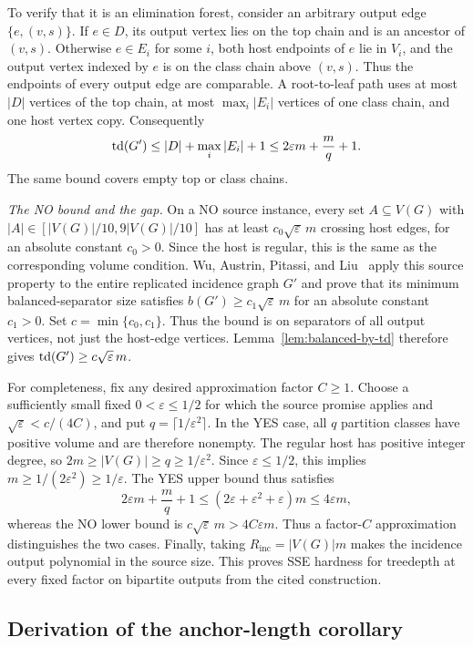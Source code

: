 To verify that it is an elimination forest, consider an arbitrary
output edge $\{e,(v,s)\}$. If $e\in D$, its output vertex lies on
the top chain and is an ancestor of $(v,s)$. Otherwise $e\in E_i$
for some $i$, both host endpoints of $e$ lie in $V_i$, and the
output vertex indexed by $e$ is on the class chain above $(v,s)$.
Thus the endpoints of every output edge are comparable. A
root-to-leaf path uses at most $|D|$ vertices of the top chain,
at most $\max_i|E_i|$ vertices of one class chain, and one host
vertex copy. Consequently
\[
 \operatorname{td}(G')\leq |D|+\max_i|E_i|+1
 \leq 2\varepsilon m+\frac{m}{q}+1.
\]
The same bound covers empty top or class chains.

\emph{The NO bound and the gap.}
On a NO source instance, every set $A\subseteq V(G)$ with
$|A|\in[|V(G)|/10,9|V(G)|/10]$ has at least
$c_0\sqrt{\varepsilon}\,m$ crossing host edges, for an absolute
constant $c_0>0$. Since the host is regular, this is the same as the
corresponding volume condition. Wu, Austrin, Pitassi, and Liu~\cite[Lemma~5.1]{APW}
apply this source property to the entire replicated incidence graph
$G'$ and prove that its minimum balanced-separator size satisfies
$b(G')\geq c_1\sqrt{\varepsilon}\,m$ for an absolute constant
$c_1>0$. Set $c=\min\{c_0,c_1\}$. Thus the bound is on separators
of all output vertices, not just the host-edge vertices.
Lemma~\ref{lem:balanced-by-td} therefore gives
$\operatorname{td}(G')\geq c\sqrt{\varepsilon}\,m$.

For completeness, fix any desired approximation factor $C\geq1$.
Choose a sufficiently small fixed $0<\varepsilon\leq1/2$ for which
the source promise applies and $\sqrt{\varepsilon}<c/(4C)$, and
put $q=\lceil1/\varepsilon^2\rceil$. In the YES case, all $q$
partition classes have positive volume and are therefore nonempty.
The regular host has positive integer degree, so
$2m\geq|V(G)|\geq q\geq1/\varepsilon^2$.
Since $\varepsilon\leq1/2$, this implies
$m\geq1/(2\varepsilon^2)\geq1/\varepsilon$. The YES upper bound thus satisfies
\[
 2\varepsilon m+\frac{m}{q}+1
 \leq(2\varepsilon+\varepsilon^2+\varepsilon)m
 \leq4\varepsilon m,
\]
whereas the NO lower bound is
$c\sqrt{\varepsilon}\,m>4C\varepsilon m$. Thus a factor-$C$
approximation distinguishes the two cases. Finally, taking
$R_{\mathrm{inc}}=|V(G)|m$ makes the incidence output polynomial in the source
size. This proves \textup{SSE} hardness for treedepth at every fixed factor
on bipartite outputs from the cited construction.

\subsection{Derivation of the anchor-length corollary}
\label{app:anchor-proof}

